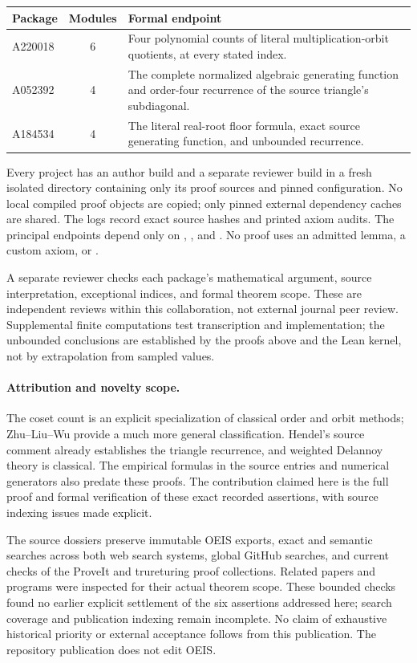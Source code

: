\documentclass[11pt]{article}
\begin{document}
\begin{center}
\begin{tabular}{@{}lcp{3.8in}@{}}
\toprule
Package & Modules & Formal endpoint\\
\midrule
A220018 & 6 & Four polynomial counts of literal multiplication-orbit quotients, at every stated index.\\
A052392 & 4 & The complete normalized algebraic generating function and order-four recurrence of the source triangle's subdiagonal.\\
A184534 & 4 & The literal real-root floor formula, exact source generating function, and unbounded recurrence.\\
\bottomrule
\end{tabular}
\end{center}

Every project has an author build and a separate reviewer build in a fresh
isolated directory containing only its proof sources and pinned configuration.
No local compiled proof objects are copied; only pinned external dependency
caches are shared. The logs record exact source hashes and printed axiom
audits. The principal endpoints depend only on ,
, and . No proof uses an admitted
lemma, a custom axiom, or .

A separate reviewer checks each package's mathematical argument, source
interpretation, exceptional indices, and formal theorem scope. These are
independent reviews within this collaboration, not external journal peer
review. Supplemental finite computations test transcription and implementation;
the unbounded conclusions are established by the proofs above and the Lean
kernel, not by extrapolation from sampled values.

\paragraph{Attribution and novelty scope.}
The coset count is an explicit specialization of classical order and orbit
methods; Zhu--Liu--Wu provide a much more general classification. Hendel's
source comment already establishes the triangle recurrence, and weighted
Delannoy theory is classical. The empirical formulas in the source entries
and numerical generators also predate these proofs. The contribution claimed
here is the full proof and formal verification of these exact recorded
assertions, with source indexing issues made explicit.

The source dossiers preserve immutable OEIS exports, exact and semantic
searches across both web search systems, global GitHub searches, and current
checks of the ProveIt and trureturing proof collections. Related papers and
programs were inspected for their actual theorem scope. These bounded checks
found no earlier explicit settlement of the six assertions addressed here;
search coverage and publication indexing remain incomplete. No claim of
exhaustive historical priority or external acceptance follows from this
publication. The repository publication does not edit OEIS.
\end{document}
